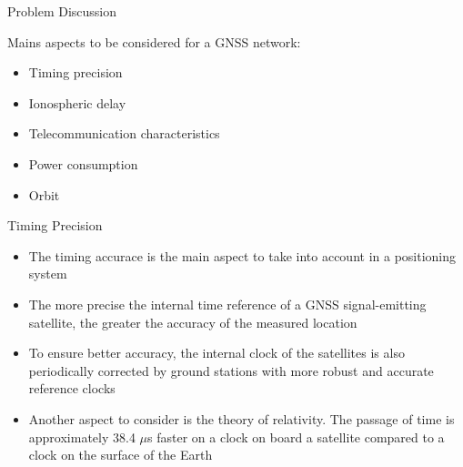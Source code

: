 %
%
%
%
%

%
%
%
%
%

\begin{frame}{Problem Discussion}

    Mains aspects to be considered for a GNSS network:

    \begin{itemize}
        \item Timing precision
        \vspace{0.2cm}
        \item Ionospheric delay
        \vspace{0.2cm}
        \item Telecommunication characteristics
        \vspace{0.2cm}
        \item Power consumption
        \vspace{0.2cm}
        \item Orbit
    \end{itemize}

\end{frame}

\begin{frame}{Timing Precision}

    \begin{itemize}
        \item The timing accurace is the main aspect to take into account in a positioning system
        \vspace{0.1cm}
        \item The more precise the internal time reference of a GNSS signal-emitting satellite, the greater the
        \vspace{0.1cm}
accuracy of the measured location
        \item To ensure better accuracy, the internal clock of the satellites is also periodically corrected by ground stations with more robust and accurate reference clocks
        \vspace{0.1cm}
        \item Another aspect to consider is the theory of relativity. The passage of time is approximately 38.4 $\mu$s faster on a clock on board a satellite compared to a clock on the surface of the Earth
    \end{itemize}

\end{frame}

